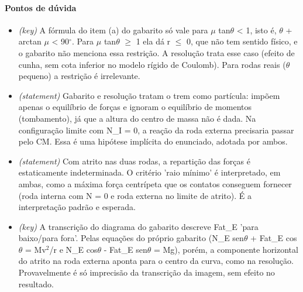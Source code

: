 \documentclass{article}%
\begin{document}
\paragraph{Pontos de dúvida}%
\begin{itemize}%
\item%
\textit{(key)} A fórmula do item (a) do gabarito só vale para $\mu$ tan$\theta$ < 1, isto é, $\theta$ + arctan $\mu$ < 90$^\circ$. Para $\mu$ tan$\theta$ $\geq$ 1 ela dá r $\leq$ 0, que não tem sentido físico, e o gabarito não menciona essa restrição. A resolução trata esse caso (efeito de cunha, sem cota inferior no modelo rígido de Coulomb). Para rodas reais ($\theta$ pequeno) a restrição é irrelevante.%
\item%
\textit{(statement)} Gabarito e resolução tratam o trem como partícula: impõem apenas o equilíbrio de forças e ignoram o equilíbrio de momentos (tombamento), já que a altura do centro de massa não é dada. Na configuração limite com N\_I = 0, a reação da roda externa precisaria passar pelo CM. Essa é uma hipótese implícita do enunciado, adotada por ambos.%
\item%
\textit{(statement)} Com atrito nas duas rodas, a repartição das forças é estaticamente indeterminada. O critério 'raio mínimo' é interpretado, em ambas, como a máxima força centrípeta que os contatos conseguem fornecer (roda interna com N = 0 e roda externa no limite de atrito). É a interpretação padrão e esperada.%
\item%
\textit{(key)} A transcrição do diagrama do gabarito descreve Fat\_E 'para baixo/para fora'. Pelas equações do próprio gabarito (N\_E sen$\theta$ + Fat\_E cos$\theta$ = Mv$^2$/r e N\_E cos$\theta$ - Fat\_E sen$\theta$ = Mg), porém, a componente horizontal do atrito na roda externa aponta para o centro da curva, como na resolução. Provavelmente é só imprecisão da transcrição da imagem, sem efeito no resultado.%
\end{itemize}%
\end{document}
